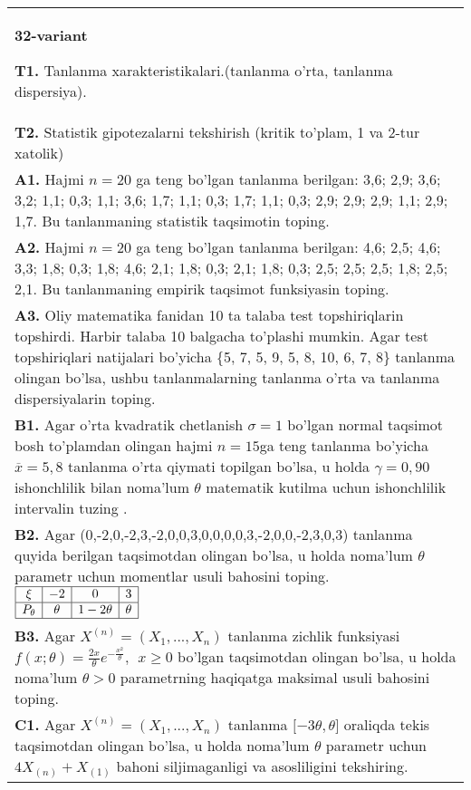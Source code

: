 \documentclass{article}
\begin{document}
\begin{tabular}{m{17cm}}
\textbf{32-variant}
\newline

\textbf{T1.} 
Tanlanma xarakteristikalari.(tanlanma o'rta, tanlanma dispersiya).
\\
\textbf{T2.} 
Statistik gipotezalarni tekshirish (kritik to'plam, 1 va 2-tur xatolik)
\\
\textbf{A1.} 
Hajmi \(n = 20\) ga teng bo'lgan tanlanma berilgan: 3,6; 2,9; 3,6; 3,2; 1,1; 0,3; 1,1; 3,6; 1,7; 1,1; 0,3; 1,7; 1,1; 0,3; 2,9; 2,9; 2,9; 1,1; 2,9; 1,7. Bu tanlanmaning statistik taqsimotin toping.
\\
\textbf{A2.} 
Hajmi \(n = 20\) ga teng bo'lgan tanlanma berilgan: 4,6; 2,5; 4,6; 3,3; 1,8; 0,3; 1,8; 4,6; 2,1; 1,8; 0,3; 2,1; 1,8; 0,3; 2,5; 2,5; 2,5; 1,8; 2,5; 2,1. Bu tanlanmaning empirik taqsimot funksiyasin toping.
\\
\textbf{A3.} 
Oliy matematika fanidan 10 ta talaba test topshiriqlarin topshirdi. Harbir talaba 10 balgacha to'plashi mumkin. Agar test topshiriqlari natijalari bo'yicha \{5, 7, 5, 9, 5, 8, 10, 6, 7, 8\} tanlanma olingan bo'lsa, ushbu tanlanmalarning tanlanma o'rta va tanlanma dispersiyalarin toping.
\\
\textbf{B1.} 
Agar o'rta kvadratik chetlanish \(\sigma = 1\) bo'lgan normal taqsimot bosh to'plamdan olingan hajmi \(n = 15\)ga teng tanlanma bo'yicha \(\overline{x} = 5,8\) tanlanma o'rta qiymati topilgan bo'lsa, u holda \(\gamma = 0,90\) ishonchlilik bilan noma'lum \(\theta\) matematik kutilma uchun ishonchlilik intervalin tuzing .
\\
\textbf{B2.} 
Agar (0,-2,0,-2,3,-2,0,0,3,0,0,0,0,3,-2,0,0,-2,3,0,3) tanlanma quyida berilgan taqsimotdan olingan bo'lsa, u holda noma'lum \(\theta\) parametr uchun momentlar usuli bahosini toping.
$\begin{array}{|c|c|c|c|}
    \hline
    \xi & - 2 & 0 & 3 \\
    \hline
    P_{\theta} & \theta & 1 - 2\theta & \theta \\
    \hline
\end{array}$
\\
\textbf{B3.} 
Agar \(X^{(n)} = \left( X_{1},...,X_{n} \right)\) tanlanma zichlik funksiyasi \(f(x;\theta) = \frac{2x}{\theta}e^{- \frac{x^{2}}{\theta}},\ \ x \geq 0\) bo'lgan taqsimotdan olingan bo'lsa, u holda noma'lum \(\theta > 0\) parametrning haqiqatga maksimal usuli bahosini toping.
\\
\textbf{C1.} 
Agar \(X^{(n)} = \left( X_{1},...,X_{n} \right)\) tanlanma \(\lbrack - 3\theta,\theta\rbrack\) oraliqda tekis taqsimotdan olingan bo'lsa, u holda noma'lum \(\theta\) parametr uchun \(4X_{(n)} + X_{(1)}\) bahoni siljimaganligi va asosliligini tekshiring.

\end{tabular}
\end{document}
